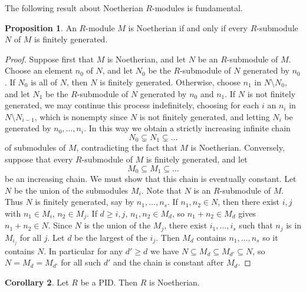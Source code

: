 \documentclass{article}
\theoremstyle{definition}\newtheorem{definition}{Definition}[subsection]
\theoremstyle{definition}\newtheorem{remark}[definition]{Remark}
\theoremstyle{definition}\newtheorem*{example}{Example}
\theoremstyle{definition}\newtheorem*{note}{Note}
\newtheorem{proposition}[definition]{Proposition}
\newtheorem{corollary}[definition]{Corollary}
\begin{document}
The following result about Noetherian $ R $-modules is fundamental.

\begin{proposition}
An $ R $-module $ M $ is Noetherian if and only if every $ R $-submodule $ N $ of $ M $ is finitely generated.
\end{proposition}

\begin{proof}
Suppose first that $ M $ is Noetherian, and let $ N $ be an $ R $-submodule of $ M $. Choose an element $ n_0 $ of $ N $, and let $ N_0 $ be the $ R $-submodule of $ N $ generated by $ n_0 $. If $ N_0 $ is all of $ N $, then $ N $ is finitely generated. Otherwise, choose $ n_1 $ in $ N \setminus N_0 $, and let $ N_1 $ be the $ R $-submodule of $ N $ generated by $ n_0 $ and $ n_1 $. If $ N $ is not finitely generated, we may continue this process indefinitely, choosing for each $ i $ an $ n_i $ in $ N \setminus N_{i - 1} $, which is nonempty since $ N $ is not finitely generated, and letting $ N_i $ be generated by $ n_0, \dots, n_i $. In this way we obtain a strictly increasing infinite chain
$$ N_0 \subsetneq N_1 \subsetneq \dots $$
of submodules of $ M $, contradicting the fact that $ M $ is Noetherian. Conversely, suppose that every $ R $-submodule of $ M $ is finitely generated, and let
$$ M_0 \subseteq M_1 \subseteq \dots $$
be an increasing chain. We must show that this chain is eventually constant. Let $ N $ be the union of the submodules $ M_i $. Note that $ N $ is an $ R $-submodule of $ M $. Thus $ N $ is finitely generated, say by $ n_1, \dots, n_s $. If $ n_1, n_2 \in N $, then there exist $ i, j $ with $ n_1 \in M_i $, $ n_2 \in M_j $. If $ d \ge i, j $, $ n_1, n_2 \in M_d $, so $ n_1 + n_2 \in M_d $ gives $ n_1 + n_2 \in N $. Since $ N $ is the union of the $ M_j $, there exist $ i_1, \dots, i_s $ such that $ n_j $ is in $ M_{i_j} $ for all $ j $. Let $ d $ be the largest of the $ i_j $. Then $ M_d $ contains $ n_1, \dots, n_s $ so it contains $ N $. In particular for any $ d' \ge d $ we have $ N \subseteq M_d \subseteq M_{d'} \subseteq N $, so $ N = M_d = M_{d'} $ for all such $ d' $ and the chain is constant after $ M_d $.
\end{proof}


\begin{corollary}
Let $ R $ be a PID. Then $ R $ is Noetherian.
\end{corollary}
\end{document}
